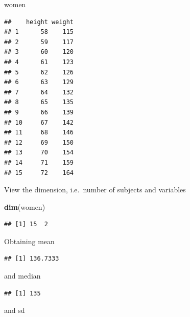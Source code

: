 \documentclass[]{book}
\newenvironment{Shaded}{\begin{snugshade}}{\end{snugshade}}
\newcommand{\KeywordTok}[1]{\textcolor[rgb]{0.13,0.29,0.53}{\textbf{#1}}}
\newcommand{\OperatorTok}[1]{\textcolor[rgb]{0.81,0.36,0.00}{\textbf{#1}}}
\newcommand{\NormalTok}[1]{#1}
\theoremstyle{definition}
\theoremstyle{definition}
\theoremstyle{remark}
\begin{document}
\begin{Shaded}
\begin{Highlighting}[]
\NormalTok{women}
\end{Highlighting}
\end{Shaded}

\begin{verbatim}
##    height weight
## 1      58    115
## 2      59    117
## 3      60    120
## 4      61    123
## 5      62    126
## 6      63    129
## 7      64    132
## 8      65    135
## 9      66    139
## 10     67    142
## 11     68    146
## 12     69    150
## 13     70    154
## 14     71    159
## 15     72    164
\end{verbatim}

View the dimension, i.e.~number of subjects and variables

\begin{Shaded}
\begin{Highlighting}[]
\KeywordTok{dim}\NormalTok{(women)}
\end{Highlighting}
\end{Shaded}

\begin{verbatim}
## [1] 15  2
\end{verbatim}

Obtaining mean

\begin{Shaded}
\end{Shaded}

\begin{verbatim}
## [1] 136.7333
\end{verbatim}

and median

\begin{Shaded}
\end{Shaded}

\begin{verbatim}
## [1] 135
\end{verbatim}

and sd

\begin{Shaded}
\end{Shaded}
\end{document}
